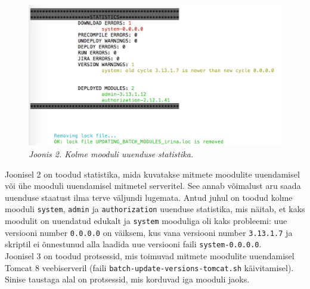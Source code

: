 \documentclass[12pt]{report}
\newcommand{\code}[1]{\texttt{#1}}
\begin{document}
   \begin{figure}[H]
     \begin{center}
       \includegraphics[width=.75\textwidth]{screenshots/statistics.png}
       \caption*{\textit{Joonis 2. Kolme mooduli uuenduse statistika.}}
     \end{center}
   \end{figure}
   
   Joonisel 2 on toodud statistika, mida kuvatakse mitmete moodulite uuendamisel või ühe mooduli uuendamisel mitmetel serveritel. See annab võimalust aru saada uuenduse staatust ilma terve väljundi lugemata. Antud juhul on toodud kolme mooduli \code{system}, \code{admin} ja \code{authorization} uuenduse statistika, mis näitab, et kaks moodulit on uuendatud edukalt ja \code{system} mooduliga oli kaks probleemi: uue versiooni number \code{0.0.0.0} on väiksem, kus vana versiooni number \code{3.13.1.7} ja skriptil ei õnnestunud alla laadida uue versiooni faili \code{system-0.0.0.0}.\\  
   
   Joonisel 3 on toodud protsessid, mis toimuvad mitmete moodulite uuendamisel Tomcat 8 veebiserveril (faili \code{batch-update-versions-tomcat.sh} käivitamisel). Sinise taustaga alal on protsessid, mis korduvad iga mooduli jaoks.
   
\end{document}
